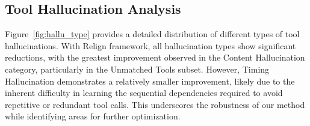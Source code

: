 
% 

\subsection{Tool Hallucination Analysis}
Figure~\ref{fig:hallu_type} provides a detailed distribution of different types of tool hallucinations. With Relign framework, all hallucination types show significant reductions, with the greatest improvement observed in the Content Hallucination category, particularly in the Unmatched Tools subset. However, Timing Hallucination demonstrates a relatively smaller improvement, likely due to the inherent difficulty in learning the sequential dependencies required to avoid repetitive or redundant tool calls. This underscores the robustness of our method while identifying areas for further optimization.


